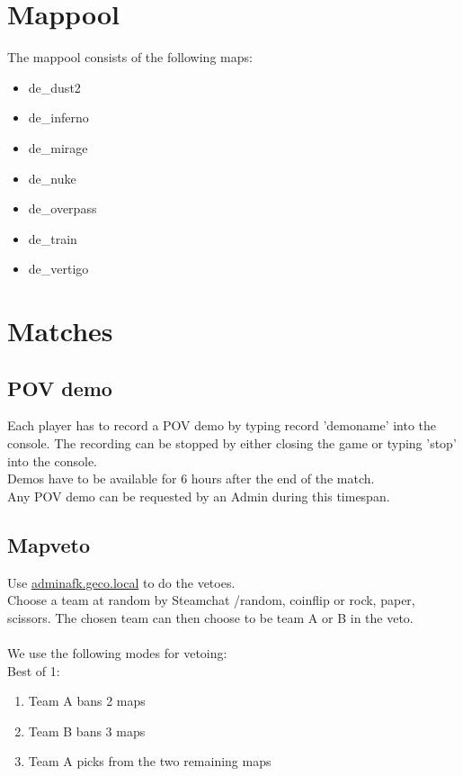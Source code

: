 \documentclass{article}
\begin{document}
\section{Mappool}
The mappool consists of the following maps:
\begin{itemize}
    \item de\_dust2
    \item de\_inferno
    \item de\_mirage
    \item de\_nuke
    \item de\_overpass
    \item de\_train
    \item de\_vertigo
\end{itemize}

\pagebreak
\section{Matches}

\subsection{POV demo}
Each player has to record a POV demo by typing record 'demoname' into the console.
The recording can be stopped by either closing the game or typing 'stop' into the console.\\
Demos have to be available for 6 hours after the end of the match.\\
Any POV demo can be requested by an Admin during this timespan.

\subsection{Mapveto}
Use \href{http://adminafk.geco.local/pages/veto.php}{adminafk.geco.local} to do the vetoes.\\
Choose a team at random by Steamchat /random, coinflip or rock, paper, scissors. The chosen team can then choose to be team A or B in the veto.\\
\\
We use the following modes for vetoing:\\

Best of 1:
\begin{enumerate}
\item Team A bans 2 maps
\item Team B bans 3 maps
\item Team A picks from the two remaining maps
\end{enumerate}
\end{document}
